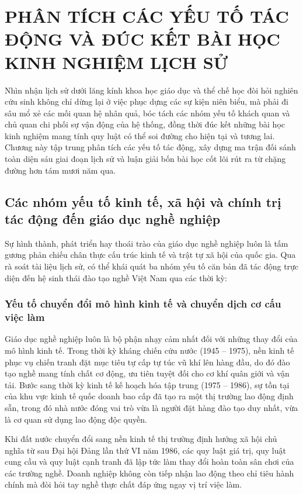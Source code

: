 \section{PHÂN TÍCH CÁC YẾU TỐ TÁC ĐỘNG VÀ ĐÚC KẾT BÀI HỌC KINH NGHIỆM LỊCH SỬ}

Nhìn nhận lịch sử dưới lăng kính khoa học giáo dục và thể chế học đòi hỏi nghiên cứu sinh không chỉ dừng lại ở việc phục dựng các sự kiện niên biểu, mà phải đi sâu mổ xẻ các mối quan hệ nhân quả, bóc tách các nhóm yếu tố khách quan và chủ quan chi phối sự vận động của hệ thống, đồng thời đúc kết những bài học kinh nghiệm mang tính quy luật có thể soi đường cho hiện tại và tương lai. Chương này tập trung phân tích các yếu tố tác động, xây dựng ma trận đối sánh toàn diện sáu giai đoạn lịch sử và luận giải bốn bài học cốt lõi rút ra từ chặng đường hơn tám mươi năm qua.

\subsection{Các nhóm yếu tố kinh tế, xã hội và chính trị tác động đến giáo dục nghề nghiệp}

Sự hình thành, phát triển hay thoái trào của giáo dục nghề nghiệp luôn là tấm gương phản chiếu chân thực cấu trúc kinh tế và trật tự xã hội của quốc gia. Qua rà soát tài liệu lịch sử, có thể khái quát ba nhóm yếu tố căn bản đã tác động trực diện đến hệ sinh thái đào tạo nghề Việt Nam qua các thời kỳ:

\subsubsection{Yếu tố chuyển đổi mô hình kinh tế và chuyển dịch cơ cấu việc làm}

Giáo dục nghề nghiệp luôn là bộ phận nhạy cảm nhất đối với những thay đổi của mô hình kinh tế. Trong thời kỳ kháng chiến cứu nước (1945 -- 1975), nền kinh tế phục vụ chiến tranh đặt mục tiêu tự cấp tự túc vũ khí lên hàng đầu, do đó đào tạo nghề mang tính chất cơ động, ưu tiên tuyệt đối cho cơ khí quân giới và vận tải. Bước sang thời kỳ kinh tế kế hoạch hóa tập trung (1975 -- 1986), sự tồn tại của khu vực kinh tế quốc doanh bao cấp đã tạo ra một thị trường lao động định sẵn, trong đó nhà nước đóng vai trò vừa là người đặt hàng đào tạo duy nhất, vừa là cơ quan sử dụng lao động độc quyền.

Khi đất nước chuyển đổi sang nền kinh tế thị trường định hướng xã hội chủ nghĩa từ sau Đại hội Đảng lần thứ VI năm 1986, các quy luật giá trị, quy luật cung cầu và quy luật cạnh tranh đã lập tức làm thay đổi hoàn toàn sân chơi của các trường nghề. Doanh nghiệp không còn tiếp nhận lao động theo chỉ tiêu hành chính mà đòi hỏi tay nghề thực chất đáp ứng ngay vị trí việc làm. 


